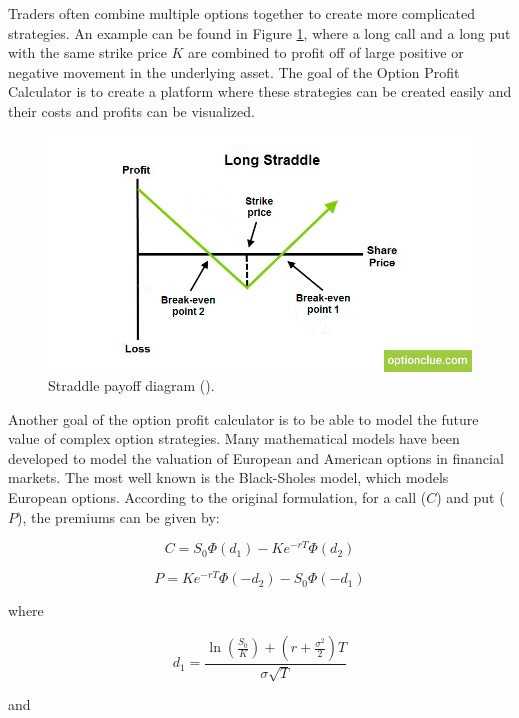 \documentclass{article}
\begin{document}
Traders often combine multiple options together to create more complicated strategies. An example can be found in Figure \ref{fig:Figure 3}, where a long call and a long put with the same strike price $K$ are combined to profit off of large positive or negative movement in the underlying asset. The goal of the Option Profit Calculator is to create a platform where these strategies can be created easily and their costs and profits can be visualized.  

\begin{figure}[htbp]
    \centering
    \includegraphics[width=1\textwidth]{assets/Straddle.jpg}
    \caption{\label{fig:Figure 3}Straddle payoff diagram (\cite{optionclue3}).}
\end{figure}

Another goal of the option profit calculator is to be able to model the future value of complex option strategies. Many mathematical models have been developed to model the valuation of European and American options in financial markets. The most well known is the Black-Sholes model, which models European options. According to the original formulation, for a call ($C$) and put ($P$), the premiums can be given by:  

$$
C = S_0 \Phi(d_1) - K e^{-rT} \Phi(d_2)
$$

$$
P = K e^{-rT} \Phi(-d_2) - S_0 \Phi(-d_1)
$$

where

$$
d_1 = \frac{\ln\left(\frac{S_0}{K}\right) + \left(r + \frac{\sigma^2}{2}\right)T}{\sigma \sqrt{T}}
$$

and
\end{document}
